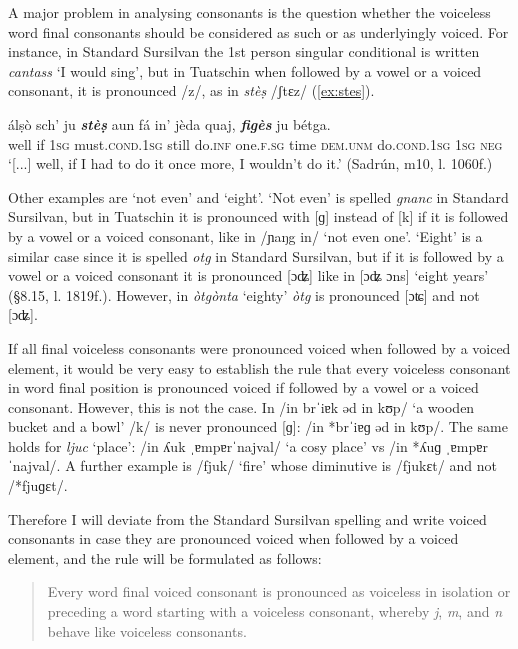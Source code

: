A major problem in analysing consonants is the question whether the voiceless word final consonants should be considered as such or as underlyingly voiced. For instance, in Standard Sursilvan the 1st person singular conditional is written \textit{cantass} `I would sing', but in Tuatschin when followed by a vowel or a voiced consonant, it is pronounced /z/, as in \textit{stèṣ} /ʃtɛz/ (\ref{ex:stes}).

\ea\label{ex:stes}
\gll [...] álṣò sch' ju \textit{\textbf{stèṣ}} aun fá in' jèda quaj, \textit{\textbf{figès}} ju bétga.\\
{} well if \textsc{1sg} must.\textsc{cond.1sg} still do.\textsc{inf} one.\textsc{f.sg} time \textsc{dem.unm} do.\textsc{cond.1sg} \textsc{1sg} \textsc{neg}\\
\glt `[...] well, if I had to do it once more, I wouldn't do it.' (Sadrún, m10, l. 1060f.)
\z

Other examples are `not even' and `eight'. `Not even' is spelled \textit{gnanc} in Standard Sursilvan, but in Tuatschin it is pronounced with [ɡ] instead of [k] if it is followed by a vowel or a voiced consonant, like in /ɲaŋg in/ `not even one'. `Eight' is a similar case since it is spelled \textit{otg} in Standard Sursilvan, but if it is followed by a vowel or a voiced consonant it is pronounced [ɔʥ] like in [ɔʥ ɔns] `eight years' (§8.15, l. 1819f.). However, in \textit{òtgònta} `eighty' \textit{òtg} is pronounced [ɔʨ] and not [ɔʥ]. 

If all final voiceless consonants were pronounced voiced when followed by a voiced element, it would be very easy to establish the rule that every voiceless consonant in word final position is pronounced voiced if followed by a vowel or a voiced consonant. However, this is not the case. In /in brˈiɐk əd in kʊp/ `a wooden bucket and a bowl' /k/ is never pronounced [ɡ]: /in *brˈiɐɡ əd in kʊp/.  The same holds for \textit{ljuc} `place': /in ʎuk ˌɐmpɐrˈnajval/ `a cosy place' vs /in *ʎuɡ ˌɐmpɐrˈnajval/. A further example is /fjuk/ `fire' whose diminutive is /fjukɛt/ and not /*fjuɡɛt/.

Therefore I will deviate from the Standard Sursilvan spelling and write voiced consonants in case they are pronounced voiced when followed by a voiced element, and the rule will be formulated as follows:

\begin{quote}
Every word final voiced consonant is pronounced as voiceless in isolation or preceding a word starting with a voiceless consonant, whereby \textit{j}, \textit{m}, and \textit{n} behave like voiceless consonants.
\end{quote}

